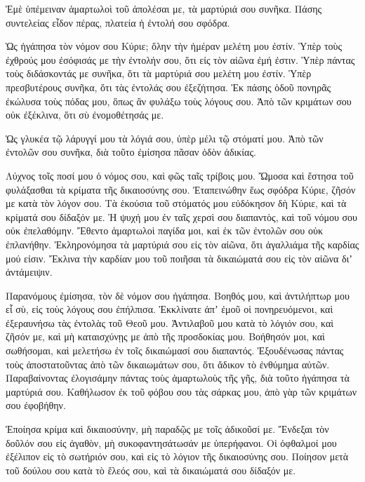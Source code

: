 {Ἐμὲ ὑπέμειναν ἁμαρτωλοὶ τοῦ ἀπολέσαι με, τὰ μαρτύριά σου συνῆκα.
Πάσης συντελείας εἶδον πέρας, πλατεία ἡ ἐντολή σου σφόδρα.
\par }{\PP {}Ὡς ἠγάπησα τὸν νόμον σου Κύριε; ὅλην τὴν ἡμέραν μελέτη μου ἐστίν.
Ὑπὲρ τοὺς ἐχθρούς μου ἐσόφισάς με τὴν ἐντολήν σου, ὅτι εἰς τὸν αἰῶνα ἐμή ἐστιν.
Ὑπὲρ πάντας τοὺς διδάσκοντάς με συνῆκα, ὅτι τὰ μαρτύριά σου μελέτη μου ἐστίν.
Ὑπὲρ πρεσβυτέρους συνῆκα, ὅτι τὰς ἐντολάς σου ἐξεζήτησα.
Ἐκ πάσης ὁδοῦ πονηρᾶς ἐκώλυσα τοὺς πόδας μου, ὅπως ἂν φυλάξω τοὺς λόγους σου.
Ἀπὸ τῶν κριμάτων σου οὐκ ἐξέκλινα, ὅτι σὺ ἐνομοθέτησάς με.
\par }{\PP {}Ὡς γλυκέα τῷ λάρυγγί μου τὰ λόγιά σου, ὑπὲρ μέλι τῷ στόματί μου.
Ἀπὸ τῶν ἐντολῶν σου συνῆκα, διὰ τοῦτο ἐμίσησα πᾶσαν ὁδὸν ἀδικίας.
\par }{\PP {}Λύχνος τοῖς ποσί μου ὁ νόμος σου, καὶ φῶς ταῖς τρίβοις μου.
Ὤμοσα καὶ ἔστησα τοῦ φυλάξασθαι τὰ κρίματα τῆς δικαιοσύνης σου.
Ἐταπεινώθην ἕως σφόδρα Κύριε, ζῆσόν με κατὰ τὸν λόγον σου.
Τὰ ἑκούσια τοῦ στόματός μου εὐδόκησον δὴ Κύριε, καὶ τὰ κρίματά σου δίδαξόν με.
Ἡ ψυχή μου ἐν ταῖς χερσὶ σου διαπαντὸς, καὶ τοῦ νόμου σου οὐκ ἐπελαθόμην.
Ἔθεντο ἁμαρτωλοὶ παγίδα μοι, καὶ ἐκ τῶν ἐντολῶν σου οὐκ ἐπλανήθην.
Ἐκληρονόμησα τὰ μαρτύριά σου εἰς τὸν αἰῶνα, ὅτι ἀγαλλιάμα τῆς καρδίας μού εἰσιν.
Ἔκλινα τὴν καρδίαν μου τοῦ ποιῆσαι τὰ δικαιώματά σου εἰς τὸν αἰῶνα διʼ ἀντάμειψιν.
\par }{\PP {}Παρανόμους ἐμίσησα, τὸν δὲ νόμον σου ἠγάπησα.
Βοηθός μου, καὶ ἀντιλήπτωρ μου εἶ σὺ, εἰς τοὺς λόγους σου ἐπήλπισα.
Ἐκκλίνατε ἀπʼ ἐμοῦ οἱ πονηρευόμενοι, καὶ ἐξεραυνήσω τὰς ἐντολὰς τοῦ Θεοῦ μου.
Ἀντιλαβοῦ μου κατὰ τὸ λόγιόν σου, καὶ ζῆσόν με, καὶ μὴ καταισχύνῃς με ἀπὸ τῆς προσδοκίας μου.
Βοήθησόν μοι, καὶ σωθήσομαι, καὶ μελετήσω ἐν τοῖς δικαιώμασί σου διαπαντός.
Ἐξουδένωσας πάντας τοὺς ἀποστατοῦντας ἀπὸ τῶν δικαιωμάτων σου, ὅτι ἄδικον τὸ ἐνθύμημα αὐτῶν.
Παραβαίνοντας ἐλογισάμην πάντας τοὺς ἁμαρτωλοὺς τῆς γῆς, διὰ τοῦτο ἠγάπησα τὰ μαρτύριά σου.
Καθήλωσον ἐκ τοῦ φόβου σου τὰς σάρκας μου, ἀπὸ γὰρ τῶν κριμάτων σου ἐφοβήθην.
\par }{\PP {}Ἐποίησα κρίμα καὶ δικαιοσύνην, μὴ παραδῷς με τοῖς ἀδικοῦσί με.
Ἔνδεξαι τὸν δοῦλόν σου εἰς ἀγαθὸν, μὴ συκοφαντησάτωσάν με ὑπερήφανοι.
Οἱ ὀφθαλμοί μου ἐξέλιπον εἰς τὸ σωτήριόν σου, καὶ εἰς τὸ λόγιον τῆς δικαιοσύνης σου.
Ποίησον μετὰ τοῦ δούλου σου κατὰ τὸ ἔλεός σου, καὶ τὰ δικαιώματά σου δίδαξόν με.
}
